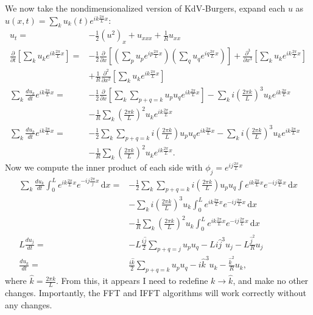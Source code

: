 \documentclass{article}
\begin{document}
We now take the nondimensionalized version of KdV-Burgers, expand each $u$ as $u(x,t) = \sum_k u_k(t)e^{ik\frac{2\pi}{L}x}$:
\begin{align*}
u_t =& -\frac{1}{2}(u^2)_x+u_{xxx}+\frac{1}{R}u_{xx}\\
\frac{\partial}{\partial t}\left[\sum_k u_ke^{ik\frac{2\pi}{L}x}\right] =& -\frac{1}{2}\frac{\partial}{\partial x}\left[\left(\sum_p u_p e^{ip\frac{2\pi}{L}x}\right)\left(\sum_q u_q e^{iq\frac{2\pi}{L}x}\right)\right]+\frac{\partial^3}{\partial x^3}\left[\sum_k u_ke^{ik\frac{2\pi}{L}x}\right] \\&+ \frac{1}{R}\frac{\partial^2}{\partial x^2}\left[\sum_k u_ke^{ik\frac{2\pi}{L}x}\right]\\
\sum_k \frac{du_k}{dt}e^{ik\frac{2\pi}{L}x}=& -\frac{1}{2}\frac{\partial}{\partial x}\left[\sum_k \sum_{p+q=k}u_pu_q e^{ik\frac{2\pi}{L}x}\right]-\sum_k i\left(\frac{2\pi k}{L}\right)^3u_k e^{ik\frac{2\pi}{L}x}\\
&-\frac{1}{R}\sum_k \left(\frac{2\pi k}{L}\right)^2u_ke^{ik\frac{2\pi}{L}x}\\
\sum_k \frac{du_k}{dt}e^{ik\frac{2\pi}{L}x}=& -\frac{1}{2}\sum_k \sum_{p+q=k}i\left(\frac{2\pi k}{L}\right)u_pu_q e^{ik\frac{2\pi}{L}x}-\sum_k i\left(\frac{2\pi k}{L}\right)^3u_k e^{ik\frac{2\pi}{L}x}\\
&-\frac{1}{R}\sum_k \left(\frac{2\pi k}{L}\right)^2u_ke^{ik\frac{2\pi}{L}x}.
\end{align*}Now we compute the inner product of each side with $\phi_j = e^{ij\frac{2\pi}{L}x}$
\begin{align*}
\sum_k \frac{du_k}{dt}\int_0^Le^{ik\frac{2\pi}{L}x}e^{-ij\frac{2\pi}{j}x}\,\mathrm{d}x =&-\frac{1}{2}\sum_k \sum_{p+q=k}i\left(\frac{2\pi k}{L}\right)u_pu_q \int e^{ik\frac{2\pi}{L}x}e^{-ij\frac{2\pi}{L}x}\,\mathrm{d}x\\
&-\sum_k i\left(\frac{2\pi k}{L}\right)^3u_k \int_0^Le^{ik\frac{2\pi}{L}x}e^{-ij\frac{2\pi}{L}x}\,\mathrm{d}x\\
&-\frac{1}{R}\sum_k \left(\frac{2\pi k}{L}\right)^2u_k\int_0^Le^{ik\frac{2\pi}{L}x}e^{-ij\frac{2\pi}{L}x}\,\mathrm{d}x\\
L\frac{du_j}{dt}=& -L\frac{i\hat{j}}{2}\sum_{p+q=j}u_pu_q - Li\hat{j}^3u_j - L\frac{\hat{j}^2}{R}u_j\\
\frac{du_k}{dt} =& \frac{i\hat{k}}{2}\sum_{p+q=k}u_pu_q - i\hat{k}^3u_k - \frac{\hat{k}^2}{R}u_k,
\end{align*}where $\hat{k} = \frac{2\pi k}{L}$. From this, it appears I need to redefine $k\to \hat{k}$, and make no other changes. Importantly, the FFT and IFFT algorithms will work correctly without any changes.
\end{document}
